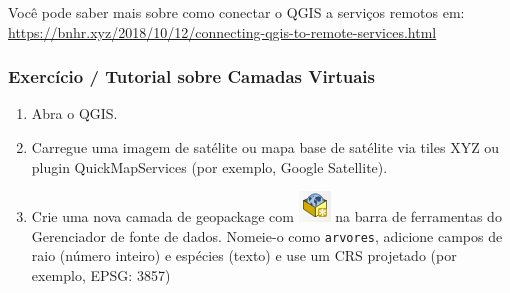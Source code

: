 \documentclass[
  portuguese,
]{krantz}
\providecommand{\tightlist}{%
  \setlength{\itemsep}{0pt}\setlength{\parskip}{0pt}}
\begin{document}
Você pode saber mais sobre como conectar o QGIS a serviços remotos em: \href{https://bnhr.xyz/2018/\%2012/10\%20/\%20Connecting-qgis-to-remote-services.html}{https://bnhr.xyz/2018/10/12/connecting-qgis-to-remote-services.html}

\hypertarget{exercuxedcio-tutorial-sobre-camadas-virtuais}{%
\subsubsection{\texorpdfstring{\textbf{Exercício / Tutorial sobre Camadas Virtuais}}{Exercício / Tutorial sobre Camadas Virtuais}}\label{exercuxedcio-tutorial-sobre-camadas-virtuais}}

\begin{enumerate}
\def\labelenumi{\arabic{enumi}.}
\tightlist
\item
  Abra o QGIS.
\item
  Carregue uma imagem de satélite ou mapa base de satélite via tiles XYZ ou plugin QuickMapServices (por exemplo, Google Satellite).
\item
  Crie uma nova camada de geopackage com \includegraphics{media/modulo2/symbol-gpkg.png} na barra de ferramentas do Gerenciador de fonte de dados. Nomeie-o como \texttt{arvores}, adicione campos de raio (número inteiro) e espécies (texto) e use um CRS projetado (por exemplo, EPSG: 3857)
\end{enumerate}
\end{document}
